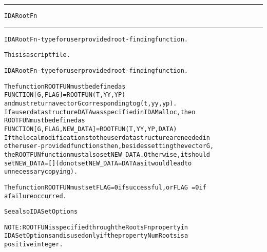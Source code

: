 \begin{samepage}
\hrule
\begin{center}
{\large \verb!IDARootFn!}
\label{p:IDARootFn}
\end{center}
\hrule\vspace{0.1in}



\begin{alltt}
IDARootFn - type for user provided root-finding function.
\end{alltt}

\end{samepage}



\begin{samepage}


\begin{alltt}
This is a script file. 
\end{alltt}

\end{samepage}



\begin{alltt}
IDARootFn - type for user provided root-finding function.

   The function ROOTFUN must be defined as 
        FUNCTION [G, FLAG] = ROOTFUN(T,YY,YP)
   and must return a vector G corresponding to g(t,yy,yp).
   If a user data structure DATA was specified in IDAMalloc, then
   ROOTFUN must be defined as
        FUNCTION [G, FLAG, NEW_DATA] = ROOTFUN(T,YY,YP,DATA)
   If the local modifications to the user data structure are needed in
   other user-provided functions then, besides setting the vector G,
   the ROOTFUN function must also set NEW_DATA. Otherwise, it should 
   set NEW_DATA=[] (do not set NEW_DATA = DATA as it would lead to 
   unnecessary copying).

   The function ROOTFUN must set FLAG=0 if successful, or FLAG~=0 if
   a failure occurred.

   See also IDASetOptions

   NOTE: ROOTFUN is specified through the RootsFn property in
   IDASetOptions and is used only if the property NumRoots is a
   positive integer.
\end{alltt}






\vspace{0.1in}